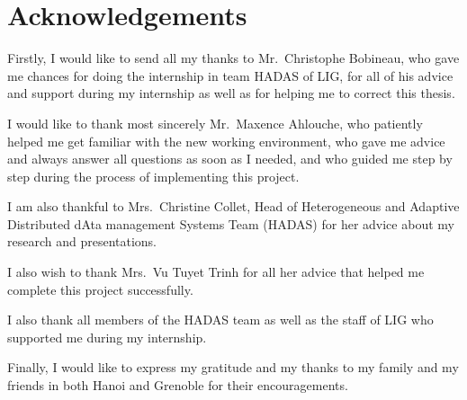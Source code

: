 
\section*{\centering Acknowledgements}

Firstly, I would like to send all my thanks to Mr.\ Christophe Bobineau, who
gave me chances for doing the internship in team HADAS of LIG, for all of his
advice and support during my internship as well as for helping me to correct
this thesis.

I would like to thank most sincerely Mr.\ Maxence Ahlouche, who patiently helped
me get familiar with the new working environment, who gave me advice and always
answer all questions as soon as I needed, and who guided me step by step during
the process of implementing this project.

I am also thankful to Mrs.\ Christine Collet, Head of Heterogeneous and Adaptive
Distributed dAta management Systems Team (HADAS) for her advice about my
research and presentations.

I also wish to thank Mrs.\ Vu Tuyet Trinh for all her advice that helped me
complete this project successfully.

I also thank all members of the HADAS team as well as the staff of LIG who
supported me during my internship.

Finally, I would like to express my gratitude and my thanks to my family and my
friends in both Hanoi and Grenoble for their encouragements.

